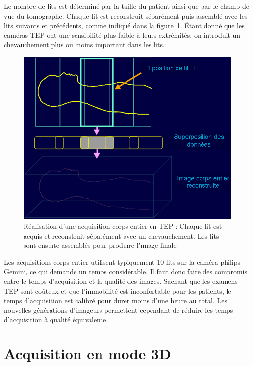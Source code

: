 Le nombre de lits est déterminé par la taille du patient ainsi que par le champ de vue du tomographe. Chaque lit est reconstruit séparément puis assemblé avec les lits suivants et précédents, comme indiqué dans la figure~\ref{fig:multilits}. \'Etant donné que les caméras TEP ont une sensibilité plus faible à leurs extrémités, on introduit un chevauchement plus ou moins important dans les lits.

\begin{figure}
\centering
\includegraphics[width=12cm]{images/multilits}
\caption[Acquisitions corps entier en TEP]{Réalisation d'une acquisition corps entier en TEP : Chaque lit est acquis et reconstruit séparément avec un chevauchement. Les lits sont ensuite assemblés pour produire l'image finale.}
\label{fig:multilits}
\end{figure}


Les acquisitions corps entier utilisent typiquement 10 lits sur la caméra philips Gemini, ce qui demande un temps considérable. Il faut donc faire des compromis entre le temps d'acquisition et la qualité des images. Sachant que les examens TEP sont coûteux et que l'immobilité est inconfortable pour les patients, le temps d'acquisition est calibré pour durer moins d'une heure au total. Les nouvelles générations d'imageurs permettent cependant de réduire les temps d'acquisition à qualité équivalente.


	\section{Acquisition en mode 3D}


